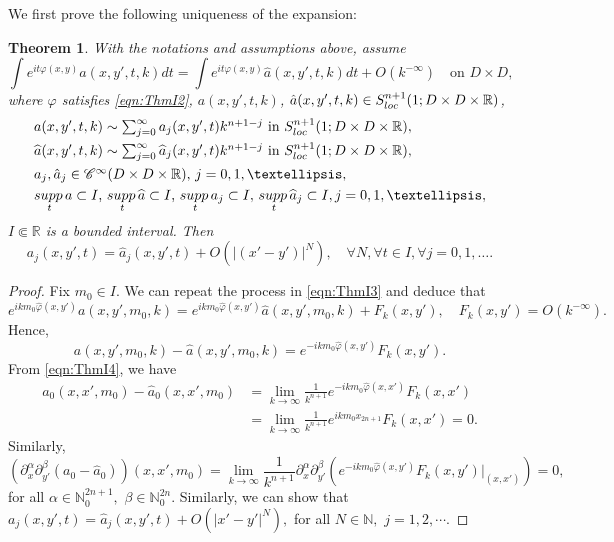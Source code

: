 \documentclass[12pt]{amsart}
\newtheorem{theorem}{Theorem}[section]
\theoremstyle{definition}
\theoremstyle{named}
\numberwithin{equation}{subsection}
\newcommand{\N}{\mathbb{N}}
\def\cC{\mathscr{C}}
\begin{document}
We first prove the following uniqueness of the expansion:

\begin{theorem}\label{t-gue241125yyda}
    With the notations and assumptions above, assume
    $$\int e^{it\varphi(x,y)}a(x,y',t,k)dt=\int e^{it\varphi(x,y)}\widehat{a}(x,y',t,k)dt+O(k^{-\infty})\quad \text{on }D\times D, $$
    where $\varphi$ satisfies \eqref{eqn:ThmI2}, $a(x,y',t,k)$, $\hat a(x,y',t,k)\in S^{n+1}_{{\rm loc\,}}(1;D\times D\times\mathbb R)$, 
    \[\begin{split}
        &\mbox{$a(x,y',t,k)\sim\sum^{\infty}_{j=0}a_j(x,y',t)k^{n+1-j}$ in $S^{n+1}_{{\rm loc}}(1;D\times D\times\mathbb R)$},\\
        &\mbox{$\widehat{a}(x,y',t,k)\sim\sum^{\infty}_{j=0}\widehat{a}_j(x,y',t)k^{n+1-j}$ in $S^{n+1}_{{\rm loc\,}}(1;D\times D\times\mathbb R)$,}\\
        &\mbox{$a_j, \hat a_j\in\cC^\infty(D\times D\times\mathbb R)$, $j=0,1,\ldots$},\\
        &\mbox{$\underset{t}{\rm supp\,}a\subset I$, $\underset{t}{\rm supp\,}\widehat{a}\subset I$, $\underset{t}{\rm supp\,}a_j\subset I,$ $\underset{t}{\rm supp\,}\widehat{a}_j\subset I, j=0,1,\dots,$}
        \end{split}\]
        $I \Subset\mathbb R$ is a bounded interval. Then
    $$a_j(x,y',t)=\widehat{a}_j(x,y',t)+O(|(x'-y')|^N),\quad \forall N,\forall t\in I, \forall j=0,1,\dots.$$
\end{theorem}

\begin{proof}
    Fix $m_0\in I.$ We can repeat the process in \eqref{eqn:ThmI3} and deduce that 
    $$e^{ikm_0\widehat{\varphi}(x,y')}a(x,y',m_0,k)=e^{ikm_0\widehat{\varphi}(x,y')}\widehat{a}(x,y',m_0,k)+F_k(x,y'),\quad F_k(x,y')=O(k^{-\infty}).$$
    Hence, 
    \begin{equation}\label{eqn:ThmI4}
        a(x,y',m_0,k)-\widehat{a}(x,y',m_0,k)=e^{-ikm_0\widehat{\varphi}(x,y')}F_k(x,y').
    \end{equation}
    From \eqref{eqn:ThmI4}, we have 
    \begin{align*}
        a_0(x,x',m_0)-\widehat{a}_0(x,x',m_0)&=\lim_{k\to\infty}\frac{1}{k^{n+1}}e^{-ikm_0\widehat{\varphi}(x,x')}F_k(x,x')\\
        &=\lim_{k\to\infty}\frac{1}{k^{n+1}}e^{ikm_0x_{2n+1}}F_k(x,x')=0.
    \end{align*}
    Similarly,
    $$\left(\partial^{\alpha}_{x}\partial^{\beta}_{y'}(a_0-\widehat{a}_0)\right)(x,x',m_0)=\lim_{k\to\infty}\frac{1}{k^{n+1}}\partial^{\alpha}_{x}\partial^{\beta}_{y'}\left(e^{-ikm_0\widehat{\varphi}(x,y')}F_k(x,y')|_{(x,x')}\right)=0,$$
    for all $\alpha\in\N_0^{2n+1},$ $\beta\in\N_0^{2n}.$
    Similarly, we can show that $a_j(x,y',t)=\widehat{a}_j(x,y',t)+O(|x'-y'|^N),$ for all $N\in\N,$ $j=1,2,\cdots.$
\end{proof}
\end{document}
